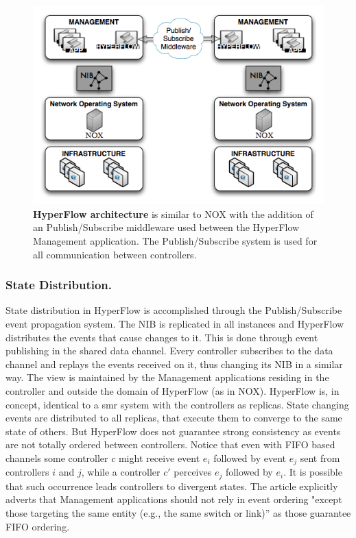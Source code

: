 \begin{itemize}
\begin{figure}
  \centering 
  \footnotesize
  \includegraphics[scale=0.5]{pic/hyperflow-design.png}
  \caption[HyperFlow architecture]{\textbf{HyperFlow architecture} is  similar to
    NOX  with the addition of an Publish/Subscribe middleware
    used between the HyperFlow Management application. The
    Publish/Subscribe system is used for all communication between controllers.}
  \label{fig:hyperflow-design}
\end{figure}


\subsubsection{State Distribution.} State distribution in HyperFlow is accomplished through the
Publish/Subscribe event propagation system. The NIB  is
replicated in all instances and HyperFlow distributes the events
that cause changes to it. This is done through event publishing in the shared
data channel. Every controller subscribes to the
data channel and replays the events received on it, thus changing its
NIB in a similar way.  The view  is maintained by the Management applications
residing in the controller and outside the domain of
HyperFlow (as in NOX). HyperFlow is, in concept,  identical to a \gls{smr} system with the controllers as replicas. State changing events are distributed to all replicas, that execute them to converge to the same state of others. 
But HyperFlow does not guarantee strong
consistency as events are not totally ordered  between controllers. 
Notice that even with FIFO based channels some controller $c$ might receive event $e_i$ followed by event
$e_j$ sent from controllers $i$ and $j$, while a controller $c'$
perceives $e_j$ followed by $e_i$. It is possible that such occurrence
leads controllers to divergent states. The article explicitly adverts
that Management applications should not rely in event ordering "except
those targeting the same entity (e.g., the same switch or link)'' as
those guarantee FIFO ordering. 


\end{itemize}
